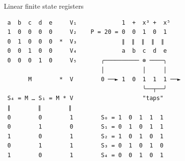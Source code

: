 \documentclass{beamer}
\begin{document}
    \begin{frame}[fragile]{Linear finite state registers}
        \begin{verbatim}
 a  b  c  d  e     V₁             1  +  x³ +  x⁵
 1  0  0  0  0     V₂    P = 20 = 0  0  1  0  1
 0  1  0  0  0  *  V₃             ∥  ∥  ∥  ∥  ∥
 0  0  1  0  0     V₄             a  b  c  d  e
 0  0  0  1  0     V₅       ╭────────── ⊗ ────╮
                            │           │     │
       M        *  V        0 ──► 1  0  1  1  1 ──►
                                        ╰──┬──╯
 S₄ = M … S₁ = M * V                    "taps"
 ∥        ∥        ∥
 0        0        1        S₀ = 1  0  1  1  1
 0        1        0        S₁ = 0  1  0  1  1
 1        0        1        S₂ = 1  0  1  0  1
 0        1        1        S₃ = 0  1  0  1  0
 1        0        1        S₄ = 0  0  1  0  1
        \end{verbatim}
    \end{frame}
\end{document}

